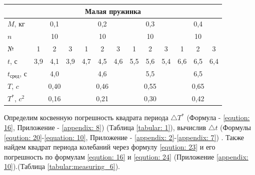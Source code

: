 \begin{table}[H]
	\begin{tabular}{|l|c|c|c|c|c|c|c|c|c|c|c|c|}
		\hline
		\multicolumn{13}{|c|}{\textbf{Малая пружинка}}                                                                                       \\ \hline
		$M$, кг              & \multicolumn{3}{c|}{0,1}  & \multicolumn{3}{c|}{0,2}  & \multicolumn{3}{c|}{0,3}  & \multicolumn{3}{c|}{0,4}  \\ \hline
		$n$                  &  \multicolumn{3}{c|}{10}  &  \multicolumn{3}{c|}{10}  &  \multicolumn{3}{c|}{10}  &  \multicolumn{3}{c|}{10}  \\ \hline
		№                    &  1  &  2  &       3       &  1  &  2  &       3       &  1  &  2  &       3       &  1  &  2  &       3       \\ \hline
		$t$, с               & 3,9 & 4,1 &      3,9      & 4,7 & 4,5 &      4,6      & 5,5 & 5,6 &      5,4      & 6,6 & 6,5 &      6,4      \\ \hline
		$t_{\text{сред}}$, с & \multicolumn{3}{c|}{4,0}  & \multicolumn{3}{c|}{4,6}  & \multicolumn{3}{c|}{5,5}  & \multicolumn{3}{c|}{6,5}  \\ \hline
		$T$, $c$             & \multicolumn{3}{c|}{0,40} & \multicolumn{3}{c|}{0,46} & \multicolumn{3}{c|}{0,55} & \multicolumn{3}{c|}{0,65} \\ \hline
		$T^*$, $c^2$         & \multicolumn{3}{c|}{0,16} & \multicolumn{3}{c|}{0,21} & \multicolumn{3}{c|}{0,30} & \multicolumn{3}{c|}{0,42} \\ \hline
	\end{tabular}
\end{table}

Определим косвенную погрешность квадрата периода $\triangle T^*$ (Формула - \ref{eqution: 16}, Приложение - \ref{appendix: 8}) (Таблица \ref{tabular: 1}), вычислив  $\triangle t$ (Формулы \ref{eqution: 20}-\ref{equation: 10}, Приложение - \ref{appendix: 2}-\ref{appendix: 7}) . Также найдем квадрат периода колебаний через формулу \ref{eqution: 23} и его погрешность по формулам \ref{eqution: 16} и \ref{eqution: 24} (Приложение \ref{appendix: 10}).(Таблица \ref{tabular:measuring_6}). 

